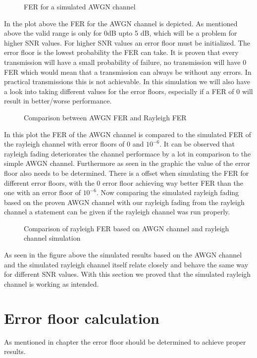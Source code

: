 \begin{figure}[!htb]
	\setlength{}
	\setlength\fheight{0.4\textheight}
    \centering
    
    \caption{FER for a simulated AWGN channel}
    \label{fig:FERAWGN}
\end{figure}
In the plot above the \gls{FER} for the AWGN channel is depicted. As mentioned above the valid range is only for 0dB upto 5 dB, which will be a problem for higher \gls{SNR} values. For higher SNR values an error floor must be initialized. The error floor is the lowest probability the \gls{FER} can take. It is proven that every transmission will have a small probability of failure, no transmission will have 0 \gls{FER} which would mean that a transmission can always be without any errors. In practical transmissions this is not achievable. In this simulation we will also have a look into taking different values for the error floors, especially if a \gls{FER} of 0 will result in better/worse performance.
\begin{figure}[!htb]
	\setlength{}
	\setlength\fheight{0.4\textheight}
	\centering
	
	\caption{Comparison between AWGN FER and Rayleigh FER}
	\label{fig:FERAWGNRAY}
\end{figure}
In this plot the \gls{FER} of the AWGN channel is compared to the simulated \gls{FER} of the rayleigh channel with error floors of $0$ and $10^{-6}$. It can be observed that rayleigh fading deteriorates the channel performace by a lot in comparison to the simple AWGN channel. Furthermore as seen in the graphic the value of the error floor also needs to be determined. There is a offset when simulating the \gls{FER} for different error floors, with the 0 error floor achieving way better \gls{FER} than the one with an error floor of $10^{-6}$. Now comparing the simulated rayleigh fading based on the proven AWGN channel with our rayleigh fading from the rayleigh channel a statement can be given if the rayleigh channel was run properly.
\begin{figure}[!htb]
	\setlength{}
	\setlength\fheight{0.4\textheight}
	\centering
	
	\caption{Comparison of rayleigh FER based on AWGN channel and rayleigh channel simulation}
	\label{fig:AWGNRAY}
\end{figure}
As seen in the figure above the simulated results based on the AWGN channel and the simulated rayleigh channel itself relate closely and behave the same way for different \gls{SNR} values. With this section we proved that the simulated rayleigh channel is working as intended. 
\section{Error floor calculation}
As mentioned in chapter  the error floor should be determined to achieve proper results. 


\clearpage
